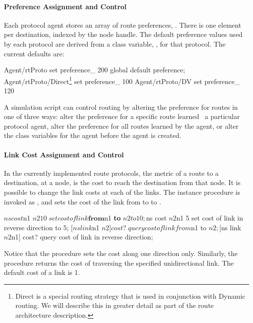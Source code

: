 \paragraph{Preference Assignment and Control}
Each protocol agent stores an array of route preferences, .
There is one element per destination, indexed by the node handle.
The default preference values used by each protocol are derived from
a class variable, , for that protocol.
The current defaults are:
\begin{program}
        Agent/rtProto set preference_ 200               \; global default preference;
        Agent/rtProto/Direct\footnote{Direct is a special routing strategy that is used in conjunction with Dynamic routing.  We will describe this in greater detail as part of the route architecture description.} set preference_ 100
        Agent/rtProto/DV set preference_ 120
\end{program}
A simulation script can control routing by altering the preference
for routes in one of three ways:
alter the preference 
for a specific route learned \via\ a particular protocol agent,
alter the preference for all routes learned by the agent, or
alter the class variables for the agent before the agent is created.

\paragraph{Link Cost Assignment and Control}
In the currently implemented route protocols,
the metric of a route to a destination, at a node,
is the cost to reach the destination from that node.
It is possible to change the link costs at each of the links.
The instance procedure
is invoked as ,%
and sets the cost of the link from  to 
to .
\begin{program}
        $ns cost $n1 $n2 10        \; set cost of link \textbf{from} $n1 \textbf{to} $n2 to 10;
        $ns cost $n2 $n1  5        \; set cost of link in reverse direction to 5;
        [$ns link $n1 $n2] cost?   \; query cost of link from $n1 to $n2;
        [$ns link $n2 $n1] cost?   \; query cost of link in reverse direction;
\end{program}
Notice that the procedure sets the cost along one direction only.
Similarly, the procedure
returns the cost of traversing the specified unidirectional link.
The default cost of a link is 1.

